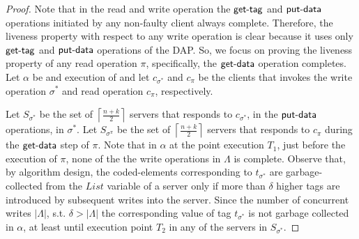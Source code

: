 				\begin{proof}
				Note that in the read and write operation the  $\act{get-tag}$ and $\act{put-data}$ operations initiated by any non-faulty client  always complete.
				Therefore, the liveness property with respect to any write operation is clear because it uses only  $\act{get-tag}$ and $\act{put-data}$ operations of the DAP. So, we focus on proving the liveness property of any read operation $\pi$, 
				specifically,   the  $\act{get-data}$ operation completes. Let $\alpha $ be and execution of \treasmod{} and let 
				$c_{\sigma^*}$ and $c_{\pi}$ be the clients that invokes the write operation $\sigma^*$ and 
				read operation $c_{\pi}$, respectively.
				
				Let $S_{\sigma^{*}}$ be the set of 
				$\left\lceil \frac{n+k}{2} \right \rceil$ servers that responds to 
				$c_{\sigma^*}$, in the $\act{put-data}$ operations, in $\sigma^*$.
				 Let $S_{\sigma^{\pi}}$ be the set of $\left\lceil \frac{n+k}{2} \right \rceil$ servers that responds to  $c_{\pi}$ during the  $\act{get-data}$ step of $\pi$. Note that in $\alpha$ at the point execution $T_1$, just before the execution of  $\pi$, none of the the write operations in 
				 $\Lambda$ is complete. Observe that,  by algorithm design, the coded-elements corresponding to  $t_{\sigma^*}$ are garbage-collected from the $List$ variable of a server only if more than $\delta$ higher tags are introduced by subsequent writes into the server.  Since the number of concurrent writes  $|\Lambda|$, s.t.  $\delta > | \Lambda |$ the corresponding value of tag $t_{\sigma^*}$ is not garbage collected in $\alpha$, at least until execution point $T_2$  in  any of the servers in $S_{\sigma^*}$.
				 

\end{proof}
